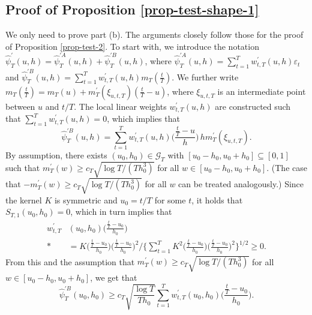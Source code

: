 \documentclass[a4paper,12pt]{article}
\begin{document}
\renewcommand{\baselinestretch}{1.2}\normalsize
\def\theequation{S.\arabic{equation}}
\setcounter{equation}{0}
\allowdisplaybreaks[1]



\subsection*{Proof of Proposition \ref{prop-test-shape-1}}


We only need to prove part (b). The arguments closely follow those for the proof of Proposition \ref{prop-test-2}. To start with, we introduce the notation $\widehat{\psi}_T^\prime(u,h) = \widehat{\psi}_T^{\prime A}(u,h) + \widehat{\psi}_T^{\prime B}(u,h)$, where $\widehat{\psi}_T^{\prime A}(u,h) = \sum\nolimits_{t=1}^T w_{t,T}^\prime(u,h) \varepsilon_t$ and $\widehat{\psi}_T^{\prime B}(u,h) = \sum\nolimits_{t=1}^T w_{t,T}^\prime(u,h) m_T(\frac{t}{T})$. We further write $m_T(\frac{t}{T}) = m_T(u) + m_T^\prime(\xi_{u,t,T})(\frac{t}{T} - u)$, where $\xi_{u,t,T}$ is an intermediate point between $u$ and $t/T$. The local linear weights $w_{t,T}^\prime(u,h)$ are constructed such that $\sum\nolimits_{t=1}^T w_{t,T}^\prime(u,h) = 0$, which implies that 
\begin{equation}\label{eq1-proof-prop-test-shape-power}
\widehat{\psi}_T^{\prime B}(u,h) = \sum\limits_{t=1}^T w_{t,T}^\prime(u,h) \Big( \frac{\frac{t}{T} - u}{h} \Big) \, h m_T^\prime(\xi_{u,t,T}).
\end{equation}
By assumption, there exists $(u_0,h_0) \in \mathcal{G}_T$ with $[u_0-h_0,u_0+h_0] \subseteq [0,1]$ such that $m_T^\prime(w) \ge c_T \sqrt{\log T/(Th_0^3)}$ for all $w \in [u_0-h_0,u_0+h_0]$. (The case that $-m_T^\prime(w) \ge c_T \sqrt{\log T/(Th_0^3)}$ for all $w$ can be treated analogously.) Since the kernel $K$ is symmetric and $u_0 = t/T$ for some $t$, it holds that $S_{T,1}(u_0,h_0) = 0$, which in turn implies that 
\begin{align*}
w_{t,T}^\prime & (u_0,h_0) \Big( \frac{\frac{t}{T} - u_0}{h_0} \Big) \\* & = K\Big(\frac{\frac{t}{T}-u_0}{h_0}\Big) \Big( \frac{\frac{t}{T} - u_0}{h_0} \Big)^2 \Big/ \Big\{ \sum_{t=1}^T K^2\Big(\frac{\frac{t}{T}-u_0}{h_0}\Big) \Big( \frac{\frac{t}{T} - u_0}{h_0} \Big)^2 \Big\}^{1/2} \ge 0. 
\end{align*}
From this and the assumption that $m_T^\prime(w) \ge c_T \sqrt{\log T/(Th_0^3)}$ for all $w \in [u_0-h_0,u_0+h_0]$, we get that 
\begin{equation}\label{eq2-proof-prop-test-shape-power}
\widehat{\psi}_T^{\prime B}(u_0,h_0) \ge c_T \sqrt{\frac{\log T}{T h_0}} \sum\limits_{t=1}^T w_{t,T}^\prime(u_0,h_0) \Big( \frac{\frac{t}{T} - u_0}{h_0} \Big).  
\end{equation}
\end{document}
